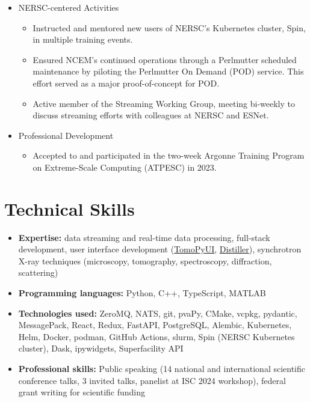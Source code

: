 \documentclass[11pt]{article} %
\begin{document}
\begin{itemize}
  \item NERSC-centered Activities
    \begin{itemize}
      \item Instructed and mentored new users of NERSC's Kubernetes cluster, Spin, in multiple training events.
      \item Ensured NCEM's continued operations through a Perlmutter scheduled maintenance by piloting the Perlmutter On Demand (POD) service. This effort served as a major proof-of-concept for POD.\
      \item Active member of the Streaming Working Group, meeting bi-weekly to discuss streaming efforts with colleagues at NERSC and ESNet.
    \end{itemize}

  \item Professional Development
    \begin{itemize}
      \item Accepted to and participated in the two-week Argonne Training Program on Extreme-Scale Computing (ATPESC) in 2023.
    \end{itemize}
\end{itemize}

\section{Technical Skills}

\begin{itemize}
  \item \textbf{Expertise:} data streaming and real-time data processing, full-stack development, user interface development (\href{https://onlinelibrary.wiley.com/iucr/doi/10.1107/S1600577524003989}{TomoPyUI}, \href{https://github.com/OpenChemistry/distiller}{Distiller}), synchrotron X-ray techniques (microscopy, tomography, spectroscopy, diffraction, scattering)
  \item \textbf{Programming languages:} Python, C++, TypeScript, MATLAB
  \item \textbf{Technologies used:} ZeroMQ, NATS, git, pvaPy, CMake, vcpkg, pydantic, MessagePack, React, Redux, FastAPI, PostgreSQL, Alembic, Kubernetes, Helm, Docker, podman, GitHub Actions, slurm, Spin (NERSC Kubernetes cluster), Dask, ipywidgets, Superfacility API
  \item \textbf{Professional skills:} Public speaking (14 national and international scientific conference talks, 3 invited talks, panelist at ISC 2024 workshop), federal grant writing for scientific funding
\end{itemize}
\end{document}
